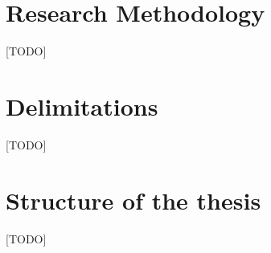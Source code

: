 \section{Research Methodology}

[TODO]

\section{Delimitations}
[TODO]

\section{Structure of the thesis}
[TODO]
